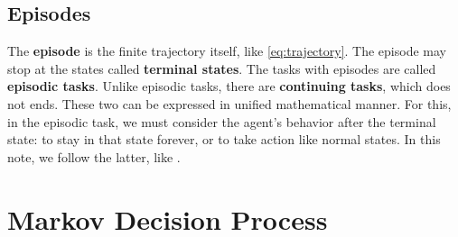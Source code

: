     \subsection{Episodes}
        The \textbf{episode} is the finite trajectory itself, like \ref{eq:trajectory}. The episode may stop at the states called \textbf{terminal states}.
        The tasks with episodes are called \textbf{episodic tasks}. Unlike episodic tasks, there are \textbf{continuing tasks}, which does not ends. These two can
        be expressed in unified mathematical manner. For this, in the episodic task, we must consider the agent's behavior after the terminal state:
        to stay in that state forever, or to take action like normal states. In this note, we follow the latter, like \cite{Zhao2025}.

\section{Markov Decision Process}
